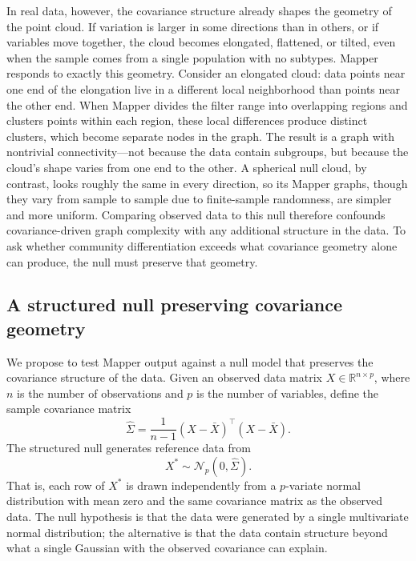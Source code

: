 \documentclass[hidelinks]{siamart251216}
\newcommand{\R}{\mathbb{R}}
\begin{document}
In real data, however, the covariance structure already shapes the
geometry of the point cloud.  If variation is larger in some directions
than in others, or if variables move together, the cloud becomes
elongated, flattened, or tilted, even when the sample comes from a
single population with no subtypes.  Mapper responds to exactly this
geometry.  Consider an elongated cloud: data points near one end of the
elongation live in a different local neighborhood than points near the
other end.  When Mapper divides the filter range into overlapping
regions and clusters points within each region, these local differences
produce distinct clusters, which become separate nodes in the graph.
The result is a graph with nontrivial connectivity---not because the
data contain subgroups, but because the cloud's shape varies from one
end to the other.  A spherical null cloud, by contrast, looks roughly
the same in every direction, so its Mapper graphs, though they vary
from sample to sample due to finite-sample randomness, are simpler and
more uniform.  Comparing observed data to this null therefore
confounds covariance-driven graph complexity with any additional
structure in the data.  To ask whether community differentiation exceeds
what covariance geometry alone can produce, the null must preserve that
geometry.

\subsection{A structured null preserving covariance geometry}\label{sec:structured-null-def}

We propose to test Mapper output against a null model that preserves
the covariance structure of the data.  Given an observed data matrix
$X \in \R^{n \times p}$, where $n$ is the number of observations and
$p$ is the number of variables, define the sample covariance matrix
\begin{equation}\label{eq:sample-cov}
  \hat{\Sigma} = \frac{1}{n-1}(X - \bar{X})^\top(X - \bar{X}).
\end{equation}
The structured null generates reference data from
\begin{equation}\label{eq:structured-null}
  X^* \sim \mathcal{N}_p(0, \hat{\Sigma}).
\end{equation}
That is, each row of $X^*$ is drawn independently from a $p$-variate
normal distribution with mean zero and the same covariance matrix as
the observed data. The null hypothesis is that the data were generated
by a single multivariate normal distribution; the alternative is that
the data contain structure beyond what a single Gaussian with the
observed covariance can explain.
\end{document}
